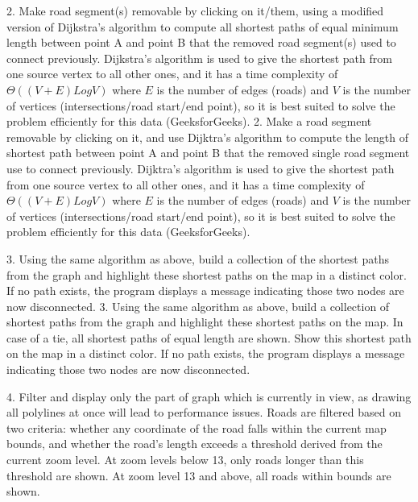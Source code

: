 \documentclass[fontsize=11pt]{article}
\begin{document}
2. Make road segment(s) removable by clicking on it/them, using a modified version of Dijkstra's algorithm to compute all shortest paths of equal minimum length between point A and point B that the removed road segment(s) used to connect previously. Dijkstra's algorithm is used to give the shortest path from one
source vertex to all other ones, and it has a time complexity of $\Theta((V+E)LogV)$ where $E$ is the number of edges (roads) and $V$ is the number of vertices (intersections/road start/end point), so it is best suited to solve the problem efficiently for this data (GeeksforGeeks).
2. Make a road segment removable by clicking on it, and use Dijktra's algorithm to compute the length of shortest path between point A and
point B that the removed single road segment use to connect previously. Dijktra's algorithm is used to give the shortest path from one source vertex to all other ones, and it has a time complexity of $\Theta((V+E)LogV)$ where $E$ is the number of edges (roads) and $V$ is the number of vertices (intersections/road start/end point), so it is best suited to solve the problem efficiently for this data (GeeksforGeeks).

3. Using the same algorithm as above, build a collection of the shortest paths from the graph and highlight these shortest paths on the map in a distinct color. If no path exists, the program displays a message indicating those two nodes are now disconnected.
3. Using the same algorithm as above, build a collection of shortest paths from the graph and highlight these shortest paths on the map. In case of a tie, all shortest paths of equal length are shown. Show this shortest path on the map in a distinct color. If no path exists, the program displays a message indicating those two nodes are now disconnected.

4. Filter and display only the part of graph which is currently in view, as drawing all polylines at once will lead to performance issues. Roads are filtered based on two criteria: whether any coordinate of the road falls within the current map bounds, and whether the road's length exceeds a threshold derived from the current zoom level. At zoom levels below 13, only roads longer than this threshold are shown. At zoom level 13 and above, all roads within bounds are shown.\\
\end{document}

